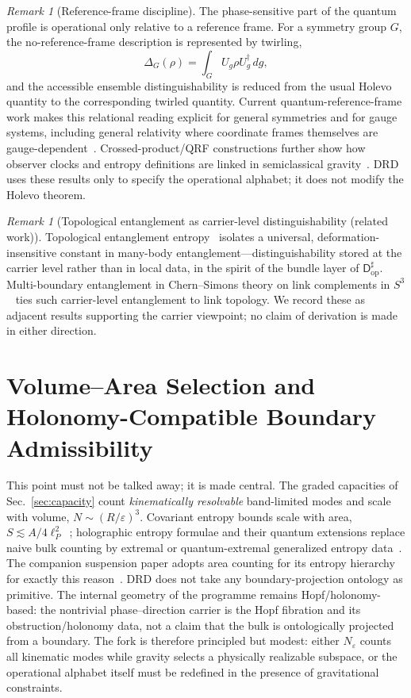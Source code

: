 \documentclass[11pt,a4paper]{article}
\theoremstyle{definition}
\theoremstyle{remark}
\newtheorem{remark}[theorem]{Remark}
\newcommand{\Sthree}{S^{3}}
\newcommand{\lP}{\ell_{P}}
\newcommand{\Dop}{\mathsf{D}^{\sharp}_{\mathrm{op}}}
\begin{document}
\begin{remark}[Reference-frame discipline]
The phase-sensitive part of the quantum profile is operational only relative to a reference
frame.  For a symmetry group $G$, the no-reference-frame description is represented by
twirling,
\[
\Delta_G(\rho)=\int_G U_g\rho U_g^\dagger\,dg,
\]
and the accessible ensemble distinguishability is reduced from the usual Holevo quantity to the
corresponding twirled quantity.  Current quantum-reference-frame work makes this relational
reading explicit for general symmetries and for gauge systems, including general relativity
where coordinate frames themselves are gauge-dependent~\cite{Vanrietvelde2023,Thiemann2026}.
Crossed-product/QRF constructions further show how observer clocks and entropy definitions are
linked in semiclassical gravity~\cite{DeVuyst2025}.  DRD uses these results only to specify the
operational alphabet; it does not modify the Holevo theorem.
\end{remark}


\begin{remark}[Topological entanglement as carrier-level distinguishability (related work)]
Topological entanglement entropy~\cite{KitaevPreskill2006,LevinWen2006} isolates a universal,
deformation-insensitive constant in many-body entanglement---distinguishability stored at the
carrier level rather than in local data, in the spirit of the bundle layer of $\Dop$.
Multi-boundary entanglement in Chern--Simons theory on link complements in
$\Sthree$~\cite{Balasubramanian2017} ties such carrier-level entanglement to link topology.
We record these as adjacent results supporting the carrier viewpoint; no claim of derivation is
made in either direction.
\end{remark}

\section{Volume--Area Selection and Holonomy-Compatible Boundary Admissibility}
\label{sec:tension}

This point must not be talked away; it is made central.  The graded capacities of
Sec.~\ref{sec:capacity} count \emph{kinematically resolvable} band-limited modes and scale
with volume, $N\sim(R/\varepsilon)^{3}$.  Covariant entropy bounds scale with area,
$S\lesssim A/4\lP^{2}$~\cite{Bousso1999}; holographic entropy formulae and their quantum
extensions replace naive bulk counting by extremal or quantum-extremal generalized entropy
data~\cite{RyuTakayanagi2006,EngelhardtWall2015}.  The companion suspension paper adopts area
counting for its entropy hierarchy for exactly this reason~\cite{PB2026susp}.  DRD does not
take any boundary-projection ontology as primitive.  The internal geometry of the programme remains
Hopf/holonomy-based: the nontrivial phase--direction carrier is the Hopf fibration and its
obstruction/holonomy data, not a claim that the bulk is ontologically projected from a
boundary.  The fork is therefore principled but modest: either $N_{\varepsilon}$ counts all
kinematic modes while gravity selects a physically realizable subspace, or the operational
alphabet itself must be redefined in the presence of gravitational constraints.
\end{document}
